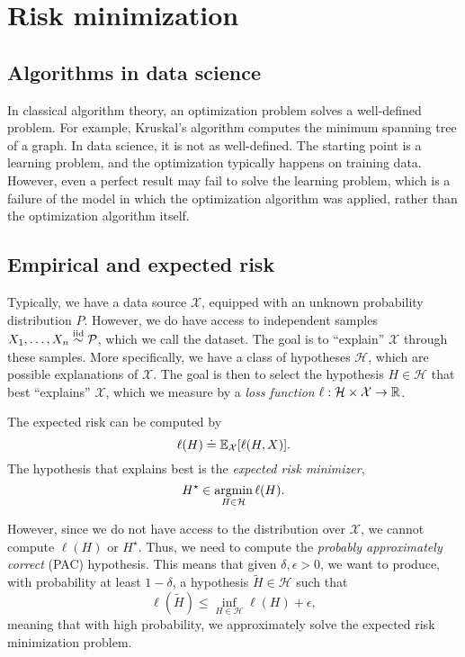 \section{Risk minimization}

\subsection{Algorithms in data science}

In classical algorithm theory, an optimization problem solves a well-defined problem. For example,
Kruskal's algorithm computes the minimum spanning tree of a graph. In data science, it is not as
well-defined. The starting point is a learning problem, and the optimization typically happens on
training data. However, even a perfect result may fail to solve the learning problem, which is a
failure of the model in which the optimization algorithm was applied, rather than the optimization
algorithm itself.

\subsection{Empirical and expected risk}

Typically, we have a data source $\mathcal{X}$, equipped with an unknown probability distribution
$P$. However, we do have access to independent samples $X_1,\ldots,X_n \overset{\mathrm{iid}}{\sim} \mathcal{P}$,
which we call the dataset. The goal is to ``explain'' $\mathcal{X}$ through these samples. More
specifically, we have a class of hypotheses $\mathcal{H}$, which are possible explanations of
$\mathcal{X}$. The goal is then to select the hypothesis $H\in \mathcal{H}$ that best ``explains''
$\mathcal{X}$, which we measure by a \textit{loss function} $\ell: \mathcal{H}\times \mathcal{X}\to
    \mathbb{R}$.

The expected risk can be computed by \[
    \ell(H) \doteq \mathbb{E}_{\mathcal{X}}[\ell(H, X)].
\]
The hypothesis that explains best is the \textit{expected risk minimizer}, \[
    H^\star \in \operatorname*{argmin}_{H\in \mathcal{H}} \ell(H).
\]

However, since we do not have access to the distribution over $\mathcal{X}$, we cannot compute
$\ell(H)$ or $H^\star$. Thus, we need to compute the \textit{probably approximately correct} (PAC)
hypothesis. This means that given $\delta,\epsilon > 0$, we want to produce, with probability at
least $1-\delta$, a hypothesis $\tilde{H}\in \mathcal{H}$ such that \[
    \ell(\tilde{H}) \leq \inf_{H\in \mathcal{H}} \ell(H) + \epsilon,
\]
meaning that with high probability, we approximately solve the expected risk minimization problem.

